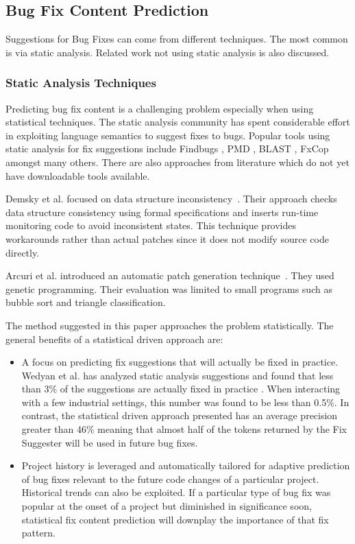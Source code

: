 \documentclass[10pt, conference, letterpaper, compsocconf]{IEEEtran}
\begin{document}
\subsection{Bug Fix Content Prediction}

Suggestions for Bug Fixes can come from different techniques. The most common is via static analysis. Related work not using static analysis is also discussed. 

\subsubsection{Static Analysis Techniques}

Predicting bug fix content is a challenging problem especially when
using statistical techniques. The static analysis community has spent
considerable effort in exploiting language semantics to suggest fixes
to bugs. Popular tools using static analysis for fix suggestions
include Findbugs \cite{ayewah2008using}, PMD \cite{rutar2004comparison}, BLAST \cite{muhlberg2007blast}, FxCop \cite{wagner2008evaluation} amongst many others. There are also approaches from literature which do not yet have downloadable tools available. 

Demsky et al. focused on data structure
inconsistency~\cite{demsky_data_2005,demsky_inference_2006}. Their approach
checks data structure consistency using formal specifications and inserts
run-time monitoring code to avoid inconsistent states. This technique
provides workarounds rather than actual patches since it does not modify source
code directly.

Arcuri et al. introduced an automatic patch generation
technique~\cite{arcuri_automation_2008,arcuri_multi-objective_2008,arcuri_novel_2008}. They used genetic programming. Their evaluation was limited to
small programs such as bubble sort and triangle classification.

The method suggested in this paper
approaches the problem statistically. The general benefits of a statistical
driven approach are:

\begin{itemize}
\item A focus on predicting fix suggestions that will actually be fixed in practice. Wedyan et al.
has analyzed static analysis suggestions and found that less than
3\% of the suggestions are actually fixed in practice \cite{wedyan2009effectiveness}. When interacting
with a few industrial settings, this number was found to be less than
0.5\%. In contrast, the statistical driven approach presented has an average precision greater than 46\% meaning that almost half of the tokens returned by the Fix Suggester will be used in future bug fixes.  
\item Project history is leveraged and automatically tailored for adaptive
prediction of bug fixes relevant to the future code changes of a particular
project. Historical trends can also be exploited. If a particular
type of bug fix was popular at the onset of a project but diminished
in significance soon, statistical fix content prediction will downplay
the importance of that fix pattern.
\end{itemize}
\end{document}
